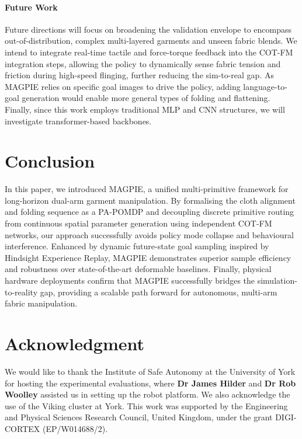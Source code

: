 \documentclass[journal]{IEEEtran}
\begin{document}
\paragraph{Future Work}
Future directions will focus on broadening the validation envelope to encompass out-of-distribution, complex multi-layered garments and unseen fabric blends. We intend to integrate real-time tactile and force-torque feedback into the COT-FM integration steps, allowing the policy to dynamically sense fabric tension and friction during high-speed flinging, further reducing the sim-to-real gap. As MAGPIE relies on specific goal images to drive the policy, adding language-to-goal generation would enable more general types of folding and flattening. Finally, since this work employs traditional MLP and CNN structures, we will investigate transformer-based backbones.

\section{Conclusion}
\label{sec:conclusion}

In this paper, we introduced MAGPIE, a unified multi-primitive framework for long-horizon dual-arm garment manipulation. By formalising the cloth alignment and folding sequence as a PA-POMDP and decoupling discrete primitive routing from continuous spatial parameter generation using independent COT-FM networks, our approach successfully avoids policy mode collapse and behavioural interference. Enhanced by dynamic future-state goal sampling inspired by Hindsight Experience Replay, MAGPIE demonstrates superior sample efficiency and robustness over state-of-the-art deformable baselines. Finally, physical hardware deployments confirm that MAGPIE successfully bridges the simulation-to-reality gap, providing a scalable path forward for autonomous, multi-arm fabric manipulation.

\section*{Acknowledgment}
We would like to thank the Institute of Safe Autonomy at the University of York for hosting the experimental evaluations, where \textbf{Dr James Hilder} and \textbf{Dr Rob Woolley} assisted us in setting up the robot platform. We also acknowledge the use of the Viking cluster at York. This work was supported by the Engineering and Physical Sciences Research Council, United Kingdom, under the grant DIGI-CORTEX (EP/W014688/2).
\end{document}

